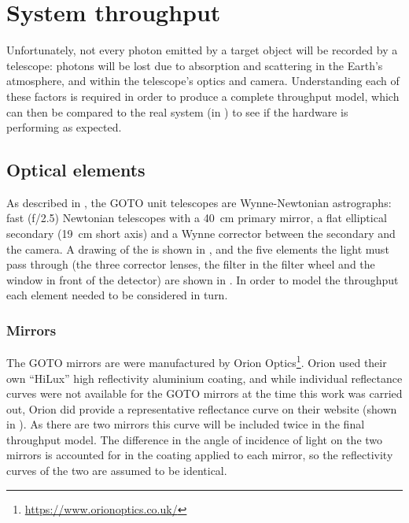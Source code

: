 
\newpage
\section{System throughput}
\label{sec:throughput}
\begin{colsection}


\begin{colsection}

Unfortunately, not every photon emitted by a target object will be recorded by a telescope: photons will be lost due to absorption and scattering in the Earth's atmosphere, and within the telescope's optics and camera. Understanding each of these factors is required in order to produce a complete throughput model, which can then be compared to the real system (in ) to see if the hardware is performing as expected.

\end{colsection}

\subsection{Optical elements}
\label{sec:optics}
\begin{colsection}

As described in , the GOTO unit telescopes are Wynne-Newtonian astrographs: fast (f/2.5) Newtonian telescopes with a \SI{40}{\centi\meter} primary mirror, a flat elliptical secondary (\SI{19}{\centi\metre} short axis) and a Wynne corrector between the secondary and the camera. A drawing of the  is shown in , and the five elements the light must pass through (the three corrector lenses, the filter in the filter wheel and the window in front of the detector) are shown in . In order to model the throughput each element needed to be considered in turn.

\subsubsection{Mirrors}

The GOTO mirrors are were manufactured by Orion Optics\footnote{\url{https://www.orionoptics.co.uk/}}. Orion used their own ``HiLux'' high reflectivity aluminium coating, and while individual reflectance curves were not available for the GOTO mirrors at the time this work was carried out, Orion did provide a representative reflectance curve on their website (shown in ). As there are two mirrors this curve will be included twice in the final throughput model. The difference in the angle of incidence of light on the two mirrors is accounted for in the coating applied to each mirror, so the reflectivity curves of the two are assumed to be identical.


\end{colsection}
\end{colsection}
